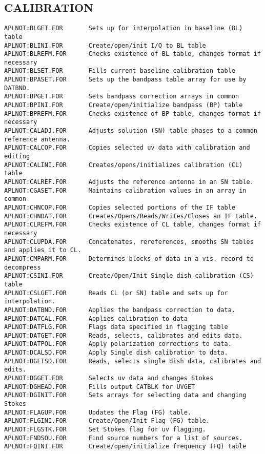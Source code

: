 \subsection{CALIBRATION}
\begin{verbatim}
APLNOT:BLGET.FOR       Sets up for interpolation in baseline (BL) table
APLNOT:BLINI.FOR       Create/open/init I/O to BL table
APLNOT:BLREFM.FOR      Checks existence of BL table, changes format if necessary
APLNOT:BLSET.FOR       Fills current baseline calibration table
APLNOT:BPASET.FOR      Sets up the bandpass table array for use by DATBND.
APLNOT:BPGET.FOR       Sets bandpass correction arrays in common
APLNOT:BPINI.FOR       Create/open/initialize bandpass (BP) table
APLNOT:BPREFM.FOR      Checks existence of BP table, changes format if necessary
APLNOT:CALADJ.FOR      Adjusts solution (SN) table phases to a common reference antenna.
APLNOT:CALCOP.FOR      Copies selected uv data with calibration and editing
APLNOT:CALINI.FOR      Creates/opens/initializes calibration (CL) table
APLNOT:CALREF.FOR      Adjusts the reference antenna in an SN table.
APLNOT:CGASET.FOR      Maintains calibration values in an array in common
APLNOT:CHNCOP.FOR      Copies selected portions of the IF table
APLNOT:CHNDAT.FOR      Creates/Opens/Reads/Writes/Closes an IF table.
APLNOT:CLREFM.FOR      Checks existence of CL table, changes format if necessary
APLNOT:CLUPDA.FOR      Concatenates, rereferences, smooths SN tables and applies it to CL.
APLNOT:CMPARM.FOR      Determines blocks of data in a vis. record to decompress
APLNOT:CSINI.FOR       Create/Open/Init Single dish calibration (CS) table
APLNOT:CSLGET.FOR      Reads CL (or SN) table and sets up for interpolation.
APLNOT:DATBND.FOR      Applies the bandpass correction to data.
APLNOT:DATCAL.FOR      Applies calibration to data
APLNOT:DATFLG.FOR      Flags data specified in flagging table
APLNOT:DATGET.FOR      Reads, selects, calibrates and edits data.
APLNOT:DATPOL.FOR      Apply polarization corrections to data.
APLNOT:DCALSD.FOR      Apply Single dish calibration to data.
APLNOT:DGETSD.FOR      Reads, selects single dish data, calibrates and edits.
APLNOT:DGGET.FOR       Selects uv data and changes Stokes
APLNOT:DGHEAD.FOR      Fills output CATBLK for UVGET
APLNOT:DGINIT.FOR      Sets arrays for selecting data and changing Stokes
APLNOT:FLAGUP.FOR      Updates the Flag (FG) table.
APLNOT:FLGINI.FOR      Create/Open/Init Flag (FG) table.
APLNOT:FLGSTK.FOR      Set Stokes flag for uv flagging.
APLNOT:FNDSOU.FOR      Find source numbers for a list of sources.
APLNOT:FQINI.FOR       Create/open/initialize frequency (FQ) table

\end{verbatim}
